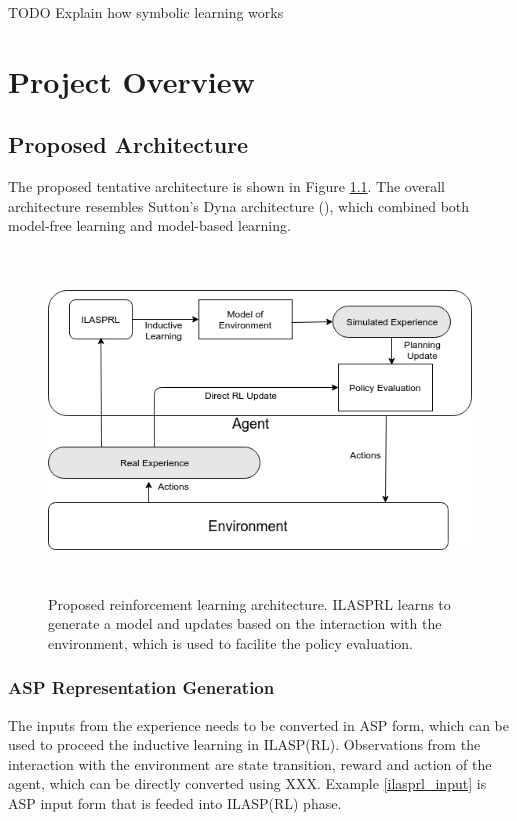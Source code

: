 \documentclass[12pt,twoside]{report}
\begin{document}
TODO Explain how symbolic learning works


\chapter{Project Overview}
\label{project_overview}

\section{Proposed Architecture}
\label{proposed_architecture_section}

The proposed tentative architecture is shown in Figure \ref{proposed_architecture}. The overall architecture resembles Sutton's Dyna architecture (\cite{Sutton1990}), which combined both model-free learning and model-based learning.

\begin{figure}[!htb]
\centering
\includegraphics[width=15cm, height=9cm]{./figures/ILASRL}
\caption{Proposed reinforcement learning architecture. ILASPRL learns to generate a model and updates based on the interaction with the environment, which is used to facilite the policy evaluation. }
\label{proposed_architecture}
\end{figure}


\subsection{ASP Representation Generation}

The inputs from the experience needs to be converted in ASP form, which can be used to proceed the inductive learning in ILASP(RL).
Observations from the interaction with the environment are state transition, reward and action of the agent, which can be directly converted using XXX. Example \ref{ilasprl_input} is ASP input form that is feeded into ILASP(RL) phase.
\end{document}
